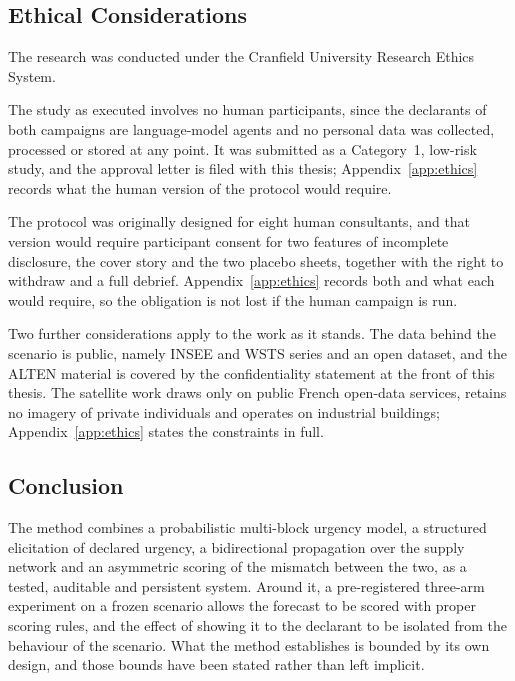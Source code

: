 \subsection{Ethical Considerations}
\label{sec:methods_ethics}

The research was conducted under the Cranfield University Research Ethics System.

 The study as
executed involves no human participants, since the declarants of both campaigns are
language-model agents and no personal data was collected, processed or stored at any point. It
was submitted as a Category~1, low-risk study, and the approval letter is filed with this
thesis; Appendix~\ref{app:ethics} records what the human version of the protocol would
require.

The protocol was originally designed for eight human consultants, and that version would
require participant consent for two features of incomplete disclosure, the cover story and the
two placebo sheets, together with the right to withdraw and a full debrief.
Appendix~\ref{app:ethics} records both and what each would require, so the obligation is not
lost if the human campaign is run.

Two further considerations apply to the work as it stands. The data behind the scenario is
public, namely INSEE and WSTS series and an open dataset, and the ALTEN material is covered by
the confidentiality statement at the front of this thesis. The satellite work draws only on
public French open-data services, retains no imagery of private individuals and operates on
industrial buildings; Appendix~\ref{app:ethics} states the constraints in full.

\subsection{Conclusion}
\label{sec:methods_conclusion}

The method combines a probabilistic multi-block urgency model, a structured elicitation of
declared urgency, a bidirectional propagation over the supply network and an asymmetric
scoring of the mismatch between the two, as a tested, auditable and persistent system.
Around it, a pre-registered three-arm experiment on a frozen scenario allows the forecast to
be scored with proper scoring rules, and the effect of showing it to the declarant to be
isolated from the behaviour of the scenario. What the method establishes is bounded by its
own design, and those bounds have been stated rather than left implicit.
